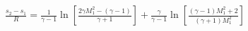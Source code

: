 \documentclass[10pt]{article}
\begin{document}
\begin{align*}\frac{s_{2}-s_{1}}{R}
=
\frac{1}{\gamma-1} 
\ln 
\left[ 
\frac{2 \gamma M_{1}^{2} - \left( \gamma -1 \right) }{\gamma + 1}
\right]
+
\frac{\gamma}{\gamma-1}
\ln 
\left[ 
\frac{ \left( \gamma -1 \right) M_{1}^{2} + 2 }{ \left( \gamma + 1 \right) M_{1}^{2} }
\right]\end{align*}
\end{document}
